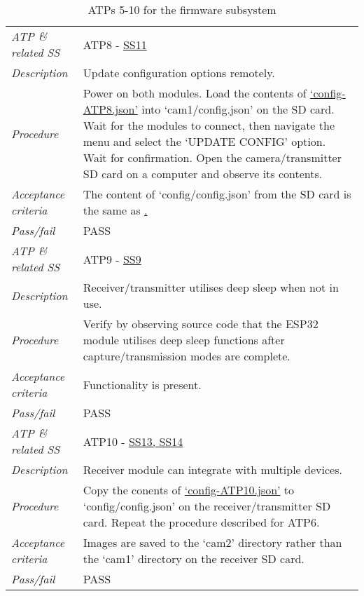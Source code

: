\documentclass[class=report,11pt,crop=false]{standalone}
\begin{document}
\begin{table}[!ht]
\begin{scriptsize}
\begin{tabularx}{\textwidth}{|p{} X|}
        \textit{ATP \& related SS} & ATP8 - \hyperlink{tab:firmware-requirements}{SS11}\\
        \textit{Description} & Update configuration options remotely.\\
        \textit{Procedure} & Power on both modules. Load the contents of \href{https://github.com/rothdu/EEE4113F-Group13-2024/blob/main/firmware/json-samples/config-ATP8.json}{`config-ATP8.json'} into `cam1/config.json' on the SD card. Wait for the modules to connect, then navigate the menu and select the `UPDATE CONFIG' option. Wait for confirmation. Open the camera/transmitter SD card on a computer and observe its contents.\\
        \textit{Acceptance criteria} & The content of `config/config.json' from the SD card is the same as \href{https://github.com/rothdu/EEE4113F-Group13-2024/blob/main/firmware/json-samples/config-ATP8.json}.\\ 
        \textit{Pass/fail} & PASS \\ \hline

        \textit{ATP \& related SS} & ATP9 - \hyperlink{tab:firmware-requirements}{SS9}\\
        \textit{Description} & Receiver/transmitter utilises deep sleep when not in use.\\
        \textit{Procedure} & Verify by observing source code that the ESP32 module utilises deep sleep functions after capture/transmission modes are complete. \\
        \textit{Acceptance criteria} & Functionality is present.\\ 
        \textit{Pass/fail} & PASS\\ \hline

        \textit{ATP \& related SS} & ATP10 - \hyperlink{tab:firmware-requirements}{SS13, SS14}\\
        \textit{Description} & Receiver module can integrate with multiple devices.\\
        \textit{Procedure} & Copy the conents of \href{https://github.com/rothdu/EEE4113F-Group13-2024/blob/main/firmware/json-samples/config-ATP10.json}{`config-ATP10.json'} to `config/config.json' on the receiver/transmitter SD card. Repeat the procedure described for ATP6. \\
        \textit{Acceptance criteria} & Images are saved to the `cam2' directory rather than the `cam1' directory on the receiver SD card.\\ 
        \textit{Pass/fail} & PASS\\ \hline

    \end{tabularx}
    \end{scriptsize}
    \caption{ATPs 5-10 for the firmware subsystem}
    \label{tab:firmware-atps2}
\end{table}
\end{document}
